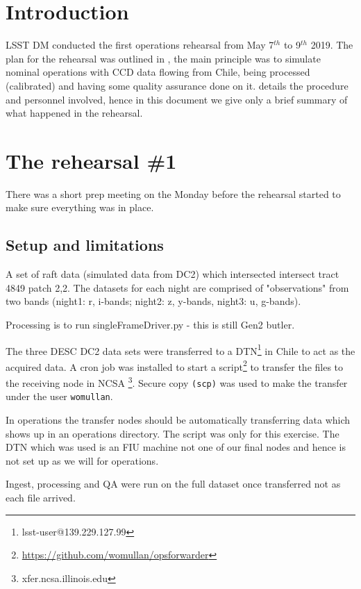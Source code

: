 \section{Introduction} \label{sec:intro}

LSST \gls{DM} conducted the first operations rehearsal from May 7$^{th}$ to 9$^{th}$ 2019.
The plan for the rehearsal was outlined in , the main principle was to simulate
nominal operations with \gls{CCD} data flowing from Chile, being processed (calibrated) and having some quality
assurance done on it.
 details the procedure and personnel involved,
hence in this document  we give only a brief summary of what  happened in the rehearsal.


\section{The rehearsal \#1}

There was a short prep meeting on the Monday before the rehearsal started to make sure everything was in place.
\subsection{Setup and limitations} \label{sec:setup}

A set of raft data (simulated data from DC2) which intersected
intersect \gls{tract} 4849 \gls{patch} 2,2.  The datasets for each night are comprised
of "observations" from two bands (night1: r, i-bands;  night2: z, y-bands, night3: u, g-bands).

Processing is to run singleFrameDriver.py - this is still Gen2 butler.

The three \gls{DESC} DC2 data sets were transferred to a DTN\footnote{lsst-user@139.229.127.99} in Chile to act as the acquired data.
A cron job was installed to start a script\footnote{\url{https://github.com/womullan/opsforwarder}} to transfer the files to the receiving node in \gls{NCSA} \footnote{xfer.ncsa.illinois.edu}. Secure copy \texttt{(scp)}  was used to make the transfer under the user \texttt{womullan}.

In operations the transfer nodes should be automatically transferring data which shows up in an operations directory. The script was only for this exercise. The \gls{DTN} which was used is an \gls{FIU} machine not one of our final nodes and hence is not set up as we will for operations.

Ingest, processing and \gls{QA} were run on the full dataset once transferred not as each file arrived.

